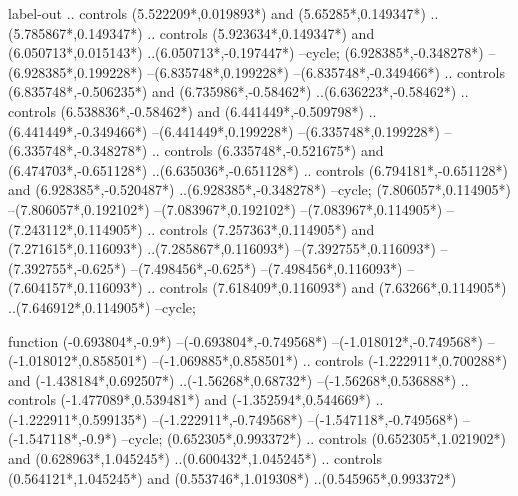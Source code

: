 {\begin{scope}[x=1mm,y=1mm,line width=\SCstroke mm,line cap=round,line join=round]
\begin{SCpart}{label-out}
.. controls ({5.522209*\SCF},{0.019893*\SCF}) and ({5.65285*\SCF},{0.149347*\SCF}) ..({5.785867*\SCF},{0.149347*\SCF})
.. controls ({5.923634*\SCF},{0.149347*\SCF}) and ({6.050713*\SCF},{0.015143*\SCF}) ..({6.050713*\SCF},{-0.197447*\SCF})
--cycle;
 ({6.928385*\SCF},{-0.348278*\SCF})
--({6.928385*\SCF},{0.199228*\SCF})
--({6.835748*\SCF},{0.199228*\SCF})
--({6.835748*\SCF},{-0.349466*\SCF})
.. controls ({6.835748*\SCF},{-0.506235*\SCF}) and ({6.735986*\SCF},{-0.58462*\SCF}) ..({6.636223*\SCF},{-0.58462*\SCF})
.. controls ({6.538836*\SCF},{-0.58462*\SCF}) and ({6.441449*\SCF},{-0.509798*\SCF}) ..({6.441449*\SCF},{-0.349466*\SCF})
--({6.441449*\SCF},{0.199228*\SCF})
--({6.335748*\SCF},{0.199228*\SCF})
--({6.335748*\SCF},{-0.348278*\SCF})
.. controls ({6.335748*\SCF},{-0.521675*\SCF}) and ({6.474703*\SCF},{-0.651128*\SCF}) ..({6.635036*\SCF},{-0.651128*\SCF})
.. controls ({6.794181*\SCF},{-0.651128*\SCF}) and ({6.928385*\SCF},{-0.520487*\SCF}) ..({6.928385*\SCF},{-0.348278*\SCF})
--cycle;
 ({7.806057*\SCF},{0.114905*\SCF})
--({7.806057*\SCF},{0.192102*\SCF})
--({7.083967*\SCF},{0.192102*\SCF})
--({7.083967*\SCF},{0.114905*\SCF})
--({7.243112*\SCF},{0.114905*\SCF})
.. controls ({7.257363*\SCF},{0.114905*\SCF}) and ({7.271615*\SCF},{0.116093*\SCF}) ..({7.285867*\SCF},{0.116093*\SCF})
--({7.392755*\SCF},{0.116093*\SCF})
--({7.392755*\SCF},{-0.625*\SCF})
--({7.498456*\SCF},{-0.625*\SCF})
--({7.498456*\SCF},{0.116093*\SCF})
--({7.604157*\SCF},{0.116093*\SCF})
.. controls ({7.618409*\SCF},{0.116093*\SCF}) and ({7.63266*\SCF},{0.114905*\SCF}) ..({7.646912*\SCF},{0.114905*\SCF})
--cycle;
\end{SCpart}
\begin{SCpart}{function}
 ({-0.693804*\SCF},{-0.9*\SCF})
--({-0.693804*\SCF},{-0.749568*\SCF})
--({-1.018012*\SCF},{-0.749568*\SCF})
--({-1.018012*\SCF},{0.858501*\SCF})
--({-1.069885*\SCF},{0.858501*\SCF})
.. controls ({-1.222911*\SCF},{0.700288*\SCF}) and ({-1.438184*\SCF},{0.692507*\SCF}) ..({-1.56268*\SCF},{0.68732*\SCF})
--({-1.56268*\SCF},{0.536888*\SCF})
.. controls ({-1.477089*\SCF},{0.539481*\SCF}) and ({-1.352594*\SCF},{0.544669*\SCF}) ..({-1.222911*\SCF},{0.599135*\SCF})
--({-1.222911*\SCF},{-0.749568*\SCF})
--({-1.547118*\SCF},{-0.749568*\SCF})
--({-1.547118*\SCF},{-0.9*\SCF})
--cycle;
 ({0.652305*\SCF},{0.993372*\SCF})
.. controls ({0.652305*\SCF},{1.021902*\SCF}) and ({0.628963*\SCF},{1.045245*\SCF}) ..({0.600432*\SCF},{1.045245*\SCF})
.. controls ({0.564121*\SCF},{1.045245*\SCF}) and ({0.553746*\SCF},{1.019308*\SCF}) ..({0.545965*\SCF},{0.993372*\SCF})

\end{SCpart}
\end{scope}}
